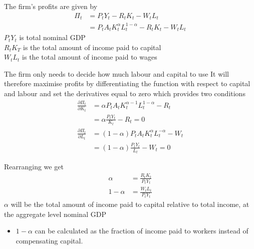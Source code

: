 \documentclass{beamer}
\begin{document}
\begin{frame}
  The firm's profits are given by
  \begin{align}
    \Pi_t &= P_tY_t - R_tK_t -W_tL_t\\ \nonumber
    &= P_tA_tK_t^{\alpha}L_t^{1-\alpha}-R_tK_t - W_tL_t  
  \end{align}
  $P_t Y_t$ is total nominal GDP\\
  $R_t K_T$ is the total amount of income paid to capital\\
  $W_t L_t$ is the total amount of income paid to wages  
\end{frame}

\begin{frame}
  The firm only needs to decide how much labour and capital to use
  It will therefore maximise profits by differentiating the function with respect to capital and labour and set the derivatives equal to zero which provides two conditions
\begin{align}
  \frac{\partial \Pi_t}{\partial K_t} &= \alpha P_tA_tK_t^{\alpha-1}L_t^{1-\alpha} -R_t\\ \nonumber
  & = \alpha \frac{P_tY_t}{K_t} - R_t = 0\\ 
  \frac{\partial \Pi_t}{\partial L_t} &= (1-\alpha) P_tA_tK_t^{\alpha}L_t^{-\alpha} - W_t \\ \nonumber
  & = (1-\alpha) \frac{P_tY_t}{L_t}- W_t = 0
\end{align}
\end{frame}

\begin{frame}
Rearranging we get
\begin{align}
  \alpha &= \frac{R_tK_t}{P_tY_t}\\ 
  1-\alpha &= \frac{W_tL_t}{P_tY_t}
\end{align}
\medskip
$\alpha$ will be the total amount of income paid to capital relative to total income, at the aggregate level nominal GDP
\begin{itemize}
  \item $1-\alpha$ can be calculated as the fraction of income paid to workers instead of compensating capital.
\end{itemize}
\end{frame}
\end{document}
